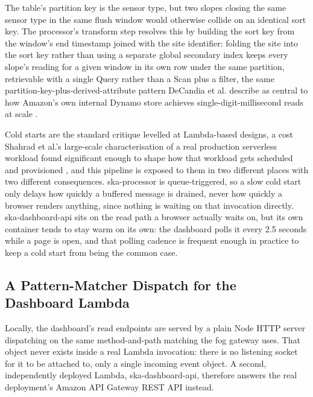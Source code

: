 \documentclass[conference]{IEEEtran}
\begin{document}
The table's partition key is the sensor type, but two slopes closing the same sensor type in the same flush window would otherwise collide on an identical sort key. The processor's transform step resolves this by building the sort key from the window's end timestamp joined with the site identifier: folding the site into the sort key rather than using a separate global secondary index keeps every slope's reading for a given window in its own row under the same partition, retrievable with a single Query rather than a Scan plus a filter, the same partition-key-plus-derived-attribute pattern DeCandia et al. describe as central to how Amazon's own internal Dynamo store achieves single-digit-millisecond reads at scale \cite{ref5}.

Cold starts are the standard critique levelled at Lambda-based designs, a cost Shahrad et al.'s large-scale characterisation of a real production serverless workload found significant enough to shape how that workload gets scheduled and provisioned \cite{ref6}, and this pipeline is exposed to them in two different places with two different consequences. ska-processor is queue-triggered, so a slow cold start only delays how quickly a buffered message is drained, never how quickly a browser renders anything, since nothing is waiting on that invocation directly. ska-dashboard-api sits on the read path a browser actually waits on, but its own container tends to stay warm on its own: the dashboard polls it every 2.5 seconds while a page is open, and that polling cadence is frequent enough in practice to keep a cold start from being the common case.

\subsection{A Pattern-Matcher Dispatch for the Dashboard Lambda}
Locally, the dashboard's read endpoints are served by a plain Node HTTP server dispatching on the same method-and-path matching the fog gateway uses. That object never exists inside a real Lambda invocation: there is no listening socket for it to be attached to, only a single incoming event object. A second, independently deployed Lambda, ska-dashboard-api, therefore answers the real deployment's Amazon API Gateway REST API instead.
\end{document}
